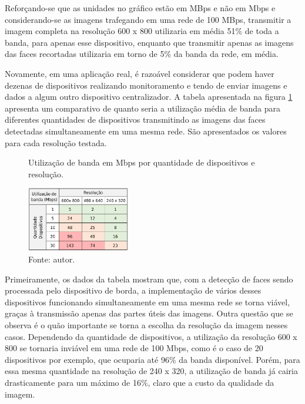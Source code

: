 Reforçando-se que as unidades no gráfico estão em MBps e não em Mbps e considerando-se as imagens trafegando em uma rede de 100 MBps, transmitir a imagem completa na resolução 600 x 800 utilizaria em média 51\% de toda a banda, para apenas esse dispositivo, enquanto que transmitir apenas as imagens das faces recortadas utilizaria em torno de 5\% da banda da rede, em média.

Novamente, em uma aplicação real, é razoável considerar que podem haver dezenas de dispositivos realizando monitoramento e tendo de enviar imagens e dados a algum outro dispositivo centralizador. A tabela apresentada na figura \ref{fig:cena2_tabela_qtde_disp_resolucao} apresenta um comparativo de quanto seria a utilização média de banda para diferentes quantidades de dispositivos transmitindo as imagens das faces detectadas simultaneamente em uma mesma rede. São apresentados os valores para cada resolução testada.

\begin{figure}[h]
    \centering
    \caption[Utilização de banda em Mbps por quantidade de dispositivos e resolução.]{Utilização de banda em Mbps por quantidade de dispositivos e resolução.}
    \includegraphics[width=0.40\textwidth]{Cap4_Experimentos_Realizados/Figures/cena2_tabela_qtde_disp_resolucao.jpg}
    \caption*{Fonte: autor.}
    \label{fig:cena2_tabela_qtde_disp_resolucao}
\end{figure}

Primeiramente, os dados da tabela mostram que, com a detecção de faces sendo processada pelo dispositivo de borda, a implementação de vários desses dispositivos funcionando simultaneamente em uma mesma rede se torna viável, graças à transmissão apenas das partes úteis das imagens. Outra questão que se observa é o quão importante se torna a escolha da resolução da imagem nesses casos. Dependendo da quantidade de dispositivos, a utilização da resolução 600 x 800 se tornaria inviável em uma rede de 100 Mbps, como é o caso de 20 dispositivos por exemplo, que ocuparia até 96\% da banda disponível. Porém, para essa mesma quantidade na resolução de 240 x 320, a utilização de banda já cairia drasticamente para um máximo de 16\%, claro que a custo da qualidade da imagem.